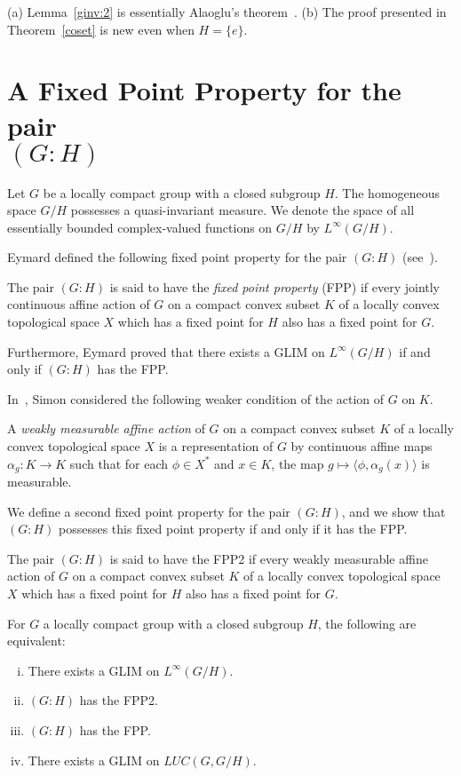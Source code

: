 \begin{remark}
(a) Lemma~\ref{ginv:2} is essentially Alaoglu's theorem~\cite[V.4.2]{d&s}.
(b) The proof presented in Theorem~\ref{coset} is new even when $H = \{e\}$.
\end{remark}

\section{A Fixed Point Property for the pair\\$(G:H)$}\label{simon}
Let $G$ be a locally compact group with a closed subgroup $H$.
The homogeneous space $G/H$ possesses a quasi-invariant measure.  We denote the space
of all essentially bounded complex-valued functions on $G/H$ by $L^\infty(G/H)$.

Eymard defined the following fixed point property for the pair $(G:H)$ (see~\cite[p. 11]{eymard}).
\begin{defn}[Eymard]\label{fpp}
The pair $(G:H)$ is said to have the {\it fixed point property} (FPP) if every jointly continuous
affine action of $G$ on a compact convex subset $K$ of a locally convex
topological space $X$ which has a fixed point for $H$ also has a fixed point for $G$.
\end{defn}
Furthermore, Eymard proved that there exists a GLIM on $L^\infty(G/H)$ if and only if $(G:H)$
has the FPP.

In~\cite{simon}, Simon considered the following weaker condition of the action of $G$ on $K$.
\begin{defn}[Simon]
A {\it weakly measurable affine action} of $G$ on a compact convex subset $K$ of a locally
convex topological space $X$ is a representation of $G$ by continuous affine maps
$\alpha_g : K \rightarrow K$ such that for each $\phi \in X^*$ and $x\in K$, the map
$g\mapsto \langle\phi, \alpha_g (x)\rangle$ is measurable.
\end{defn}

We define a second fixed point property for the pair $(G:H)$, and we show
that $(G:H)$ possesses this fixed point property if and only if it has the FPP.
\begin{defn}
The pair $(G:H)$ is said to have the
FPP2 if every weakly
measurable affine action of $G$ on a compact convex subset $K$ of a locally convex
topological space $X$ which has a fixed point for $H$ also has a fixed point for $G$.
\end{defn}
\pagebreak
\begin{theorem}
For $G$ a locally compact group with a closed subgroup $H$, the following are equivalent:
\begin{enumerate}[(i)]
\item There exists a GLIM on $L^\infty (G/H)$.
\item $(G:H)$ has the FPP2.
\item $(G:H)$ has the FPP.
\item There exists a GLIM on $LUC(G,G/H)$.
\end{enumerate}
\end{theorem}

